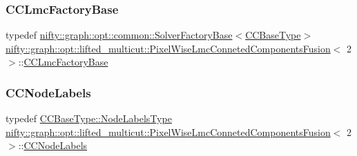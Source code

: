 \subsubsection{\texorpdfstring{C\+C\+Lmc\+Factory\+Base}{CCLmcFactoryBase}\hspace{0.1cm}{\footnotesize\ttfamily [2/2]}}
{\footnotesize\ttfamily typedef \hyperlink{classnifty_1_1graph_1_1opt_1_1common_1_1SolverFactoryBase}{nifty\+::graph\+::opt\+::common\+::\+Solver\+Factory\+Base}$<$\hyperlink{classnifty_1_1graph_1_1opt_1_1lifted__multicut_1_1PixelWiseLmcConnetedComponentsFusion_3_012_01_4_a4db4caca2bad22f2dff0390dac8dc501}{C\+C\+Base\+Type}$>$ \hyperlink{classnifty_1_1graph_1_1opt_1_1lifted__multicut_1_1PixelWiseLmcConnetedComponentsFusion}{nifty\+::graph\+::opt\+::lifted\+\_\+multicut\+::\+Pixel\+Wise\+Lmc\+Conneted\+Components\+Fusion}$<$ 2 $>$\+::\hyperlink{classnifty_1_1graph_1_1opt_1_1lifted__multicut_1_1PixelWiseLmcConnetedComponentsFusion_3_012_01_4_ab4ad143cd3473408280088a97d5680c5}{C\+C\+Lmc\+Factory\+Base}}

\mbox{\label{classnifty_1_1graph_1_1opt_1_1lifted__multicut_1_1PixelWiseLmcConnetedComponentsFusion_3_012_01_4_ab41b38aa58faf46ada5a185e801c5ac9}} 
\subsubsection{\texorpdfstring{C\+C\+Node\+Labels}{CCNodeLabels}\hspace{0.1cm}{\footnotesize\ttfamily [1/2]}}
{\footnotesize\ttfamily typedef \hyperlink{classnifty_1_1graph_1_1opt_1_1common_1_1SolverBase_abefd51561de2fd009f6bed6bef6009ea}{C\+C\+Base\+Type\+::\+Node\+Labels\+Type} \hyperlink{classnifty_1_1graph_1_1opt_1_1lifted__multicut_1_1PixelWiseLmcConnetedComponentsFusion}{nifty\+::graph\+::opt\+::lifted\+\_\+multicut\+::\+Pixel\+Wise\+Lmc\+Conneted\+Components\+Fusion}$<$ 2 $>$\+::\hyperlink{classnifty_1_1graph_1_1opt_1_1lifted__multicut_1_1PixelWiseLmcConnetedComponentsFusion_3_012_01_4_ab41b38aa58faf46ada5a185e801c5ac9}{C\+C\+Node\+Labels}}

